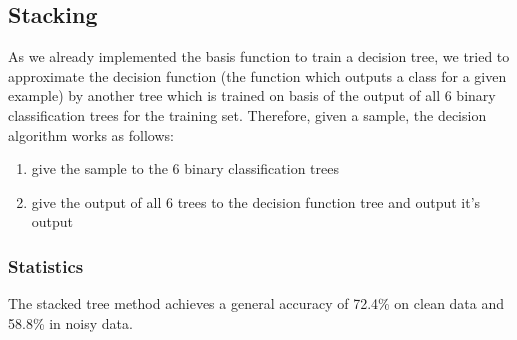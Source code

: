 \documentclass{article}
\begin{document}
\subsection{Stacking}
As we already implemented the basis function to train a decision tree, we tried to approximate the decision function (the function which outputs a class for a given example) by another tree which is trained on basis of the output of all 6 binary classification trees for the training set.
Therefore, given a sample, the decision algorithm works as follows:
\begin{enumerate}
    \item give the sample to the 6 binary classification trees
    \item give the output of all 6 trees to the decision function tree and output it's output
\end{enumerate} 

\subsubsection{Statistics}
The stacked tree method achieves a general accuracy of 72.4\% on clean data and 58.8\% in noisy data.
\end{document}
